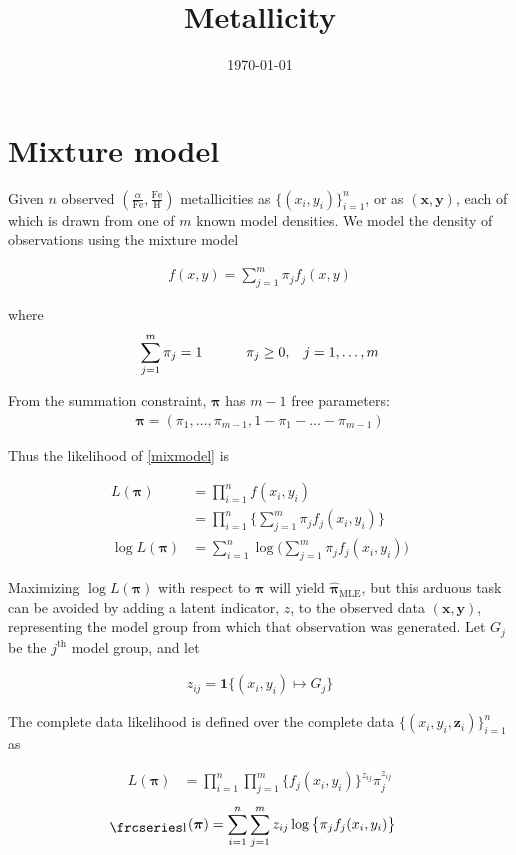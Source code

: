 \documentclass[12pt]{amsart}
\title{Metallicity}
\author{\today}
\newcommand{\textfrc}[1]{{\frcseries#1}}
\newcommand{\mathfrc}[1]{\raisebox{-0.8mm}{\text{\textfrc{\small #1}}}\hspace{0.4mm}}
\newcommand{\vect}[1]{\boldsymbol{\mathbf{#1}}}
\newcommand{\eqn}[1]{\begin{align*}
#1
\end{align*}}
\newcommand{\eqnl}[2]{\begin{align} \label{#1}
#2
\end{align}}
\newcommand{\shblock}{\hspace{3mm}}
\newcommand{\hblock}{\hspace{8mm}}
\newcommand{\eqnsep}{\shblock\hblock}
\newcommand{\bl}{\big\{}
\newcommand{\br}{\big\}}
\newcommand{\Bl}{\Big\{}
\newcommand{\Br}{\Big\}}
\newcommand{\indicator}{\mathbf{1}}
\newcommand{\vx}{\vect{x}}
\newcommand{\vy}{\vect{y}}
\newcommand{\vp}{\vect{\pi}}
\newcommand{\vpmle}{\hat{\vect{\pi}}_\text{MLE}}
\newcommand{\fab}{f_j}
\newcommand{\llp}{\mathfrc{l}(\vect{\pi})}
\newcommand{\sumn}{\sum^n_{i=1}}
\newcommand{\summ}{\sum^m_{j=1}}
\begin{document}
\maketitle






\section{Mixture model}

Given $n$ observed $(\frac{\alpha}{\text{Fe}}, \frac{\text{Fe}}{\text{H}})$ metallicities as $\bl (x_i,y_i) \br^n_{i=1}$, or as $(\vx,\vy)$, each of which is drawn from one of $m$ known model densities. We model the density of observations using the mixture model

\eqnl{mixmodel}{
	f(x,y) = \summ \pi_j \fab(x,y)
}

where \eqn{
	\summ \pi_j = 1 \eqnsep \pi_j \geq 0, \hspace{3mm} j=1,\ldots,m
 }

From the summation constraint, $\vp$ has $m-1$ free parameters: \eqn{
	\vp = (\pi_1, \ldots, \pi_{m-1}, 1-\pi_1-\ldots-\pi_{m-1})
}

Thus the likelihood of \eqref{mixmodel} is

\eqn{
	L(\vect{\pi}) &= \prod^n_{i=1} f(x_i,y_i)	 \\
	&= \prod^n_{i=1} \Bl  \summ \pi_j \fab(x_i,y_i)  \Br	\\
	\log L(\vect{\pi}) &= \sumn \log \Big( \summ \pi_j \fab(x_i,y_i)  \Big)
}

Maximizing $\log L(\vect{\pi})$ with respect to $\vp$ will yield $\vpmle$, but this arduous task can be avoided by adding a latent indicator, $z$, to the observed data $(\vx, \vy)$, representing the model group from which that observation was generated. Let $G_j$ be the $j^\text{th}$ model group, and let

\eqn{z_{ij} = \indicator \bl (x_i,y_i) \mapsto G_j \br}


The complete data likelihood is defined over the complete data $\bl (x_i,y_i,\vect{z}_i) \br^n_{i=1}$ as

\eqn{
	L(\vect{\pi}) &= \prod^n_{i=1} \prod^m_{j=1} \Bl \fab(x_i,y_i) \Br ^{z_{ij}} \pi_j^{z_{ij}}
}
\eqnl{loglike}{
	\llp &= \sumn \summ z_{ij}  \log \bl \pi_j  \fab(x_i,y_i) \br
}





\end{document}

